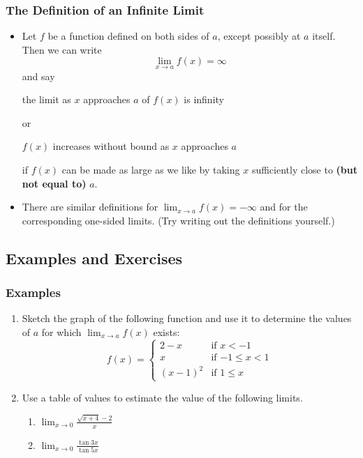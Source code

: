 \documentclass[serif,ignorenonframetext]{beamer}
\begin{document}
\begin{frame}
  \frametitle{The Definition of an Infinite Limit}
  \begin{itemize}
  \item Let $f$ be a function defined on both sides of $a$, except
    possibly at $a$ itself.  Then we can write
    \begin{displaymath}
      \lim_{x\to a} f(x) = \infty
    \end{displaymath}
    and say
    \begin{center}
      the limit as $x$ approaches $a$ of $f(x)$ is infinity
    \end{center}
    or 
    \begin{center}
      $f(x)$ increases without bound as $x$ approaches $a$
    \end{center}
    if $f(x)$ can be made as large as we like by taking $x$
    sufficiently close to \textbf{(but not equal to)} $a$.
    
    \pause
  \item There are similar definitions for
    $\displaystyle\lim_{x\to a} f(x)=-\infty$ and for the
    corresponding one-sided limits.  (Try writing out the definitions
    yourself.)
  \end{itemize}
\end{frame}

\subsection{Examples and Exercises}

\begin{frame}
  \frametitle{Examples}
  \begin{enumerate}
  \item Sketch the graph of the following function and use it
    to determine the values of $a$ for which $\lim_{x\to a} f(x)$
    exists:
    \begin{displaymath}
      f(x) = \begin{cases}
        2-x & \mbox{if $x<-1$} \\
	x   & \mbox{if $-1\le x<1$} \\
	(x-1)^2 & \mbox {if $1\le x$}
      \end{cases}
    \end{displaymath}
  \item Use a table of values to estimate the value of the following
    limits.
    \begin{enumerate}
    \item $\displaystyle\lim_{x\to 0} \frac{\sqrt{x+4}-2}{x}$
    \item $\displaystyle\lim_{x\to 0} \frac{\tan 3x}{\tan 5x}$
    \end{enumerate}
  \end{enumerate}
\end{frame}
\end{document}
